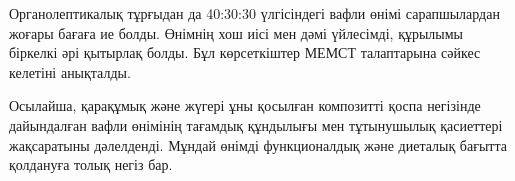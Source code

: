
Органолептикалық тұрғыдан да 40:30:30 үлгісіндегі вафли өнімі
сарапшылардан жоғары бағаға ие болды. Өнімнің хош иісі мен дәмі
үйлесімді, құрылымы біркелкі әрі қытырлақ болды. Бұл көрсеткіштер МЕМСТ
талаптарына сәйкес келетіні анықталды.

Осылайша, қарақұмық және жүгері ұны қосылған композитті қоспа негізінде
дайындалған вафли өнімінің тағамдық құндылығы мен тұтынушылық қасиеттері
жақсаратыны дәлелденді. Мұндай өнімді функционалдық және диеталық
бағытта қолдануға толық негіз бар.

